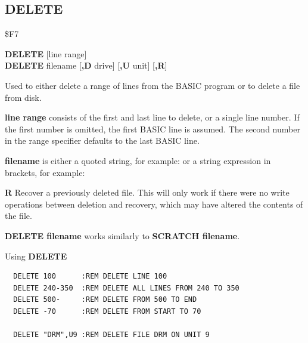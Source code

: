 \subsection{DELETE}
\begin{description}[leftmargin=2cm,style=nextline]
\item [Token:] \$F7
\item [Format:] {\bf DELETE} [line range] \\
                {\bf DELETE} filename [{\bf,D} drive] [{\bf,U} unit] [{\bf,R}]
\item [Usage:] Used to either delete
               a range of lines from the BASIC program or to delete a file from disk.

               {\bf line range} consists of the first and last
               line to delete, or a single line number.
               If the first number is omitted, the
               first BASIC line is assumed.
               The second number in the range specifier defaults
               to the last BASIC line.

   {\bf filename} is either a quoted string, for example:  or
   a string expression in brackets, for example: 

   \drivedefinition

   \unitdefinition

   {\bf R} Recover a previously deleted file.
   This will only work if there were no write operations
   between deletion and recovery, which may have altered the
   contents of the file.

\item [Remarks:] {\bf DELETE filename} works similarly to
                 {\bf SCRATCH filename}.

\item [Examples:] Using {\bf DELETE}
\begin{tcolorbox}[colback=black,coltext=white]
\verbatimfont{\codefont}
\begin{verbatim}
  DELETE 100      :REM DELETE LINE 100
  DELETE 240-350  :REM DELETE ALL LINES FROM 240 TO 350
  DELETE 500-     :REM DELETE FROM 500 TO END
  DELETE -70      :REM DELETE FROM START TO 70

  DELETE "DRM",U9 :REM DELETE FILE DRM ON UNIT 9
\end{verbatim}
\end{tcolorbox}
\end{description}


